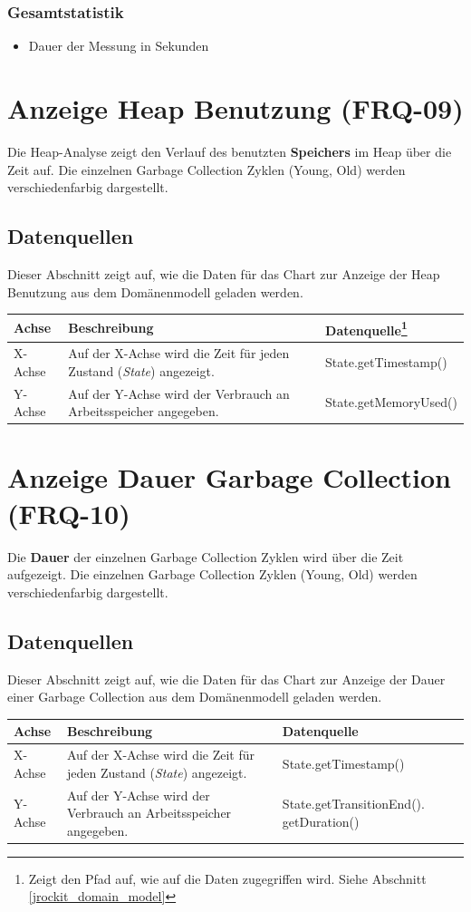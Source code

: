 \subsubsection{Gesamtstatistik}
\begin{itemize}
	\item Dauer der Messung in Sekunden
\end{itemize}

\section{Anzeige Heap Benutzung (FRQ-09)}
Die Heap-Analyse zeigt den Verlauf des benutzten \textbf{Speichers} im Heap über die Zeit auf. Die einzelnen Garbage Collection Zyklen (Young, Old) werden verschiedenfarbig dargestellt.

\subsection{Datenquellen}
Dieser Abschnitt zeigt auf, wie die Daten für das Chart zur Anzeige der Heap Benutzung aus dem Domänenmodell geladen werden.
  \begin{longtable}{|p{1.5cm}|p{5.5cm}|p{4cm}|}
\hline
  \textbf{Achse} & \textbf{Beschreibung} & \textbf{Datenquelle\footnote{Zeigt den Pfad auf, wie auf die Daten zugegriffen wird. Siehe Abschnitt \ref{jrockit_domain_model}}}\\\hline
  X-Achse & Auf der X-Achse wird die Zeit für jeden Zustand (\textit{State}) angezeigt. & State.getTimestamp()\\\hline
  Y-Achse&Auf der Y-Achse wird der Verbrauch an Arbeitsspeicher angegeben. & State.getMemoryUsed()\\\hline
\end{longtable}

\section{Anzeige Dauer Garbage Collection (FRQ-10)}
Die \textbf{Dauer} der einzelnen Garbage Collection Zyklen wird über die Zeit aufgezeigt. Die einzelnen Garbage Collection Zyklen (Young, Old) werden verschiedenfarbig dargestellt.

\subsection{Datenquellen}
Dieser Abschnitt zeigt auf, wie die Daten für das Chart zur Anzeige der Dauer einer Garbage Collection aus dem Domänenmodell geladen werden.
  \begin{longtable}{|p{1.5cm}|p{5.5cm}|p{4cm}|}
\hline
  \textbf{Achse} & \textbf{Beschreibung} & \textbf{Datenquelle}\\\hline
  X-Achse & Auf der X-Achse wird die Zeit für jeden Zustand (\textit{State}) angezeigt. & State.getTimestamp()\\\hline
  Y-Achse&Auf der Y-Achse wird der Verbrauch an Arbeitsspeicher angegeben. & State.getTransitionEnd(). getDuration()\\\hline
\end{longtable}

